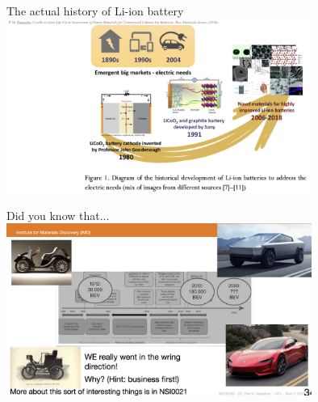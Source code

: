 \documentclass[aspectratio=169]{beamer}
\begin{document}
\begin{frame}{The actual history of Li-ion battery}
  \includegraphics[width=0.75\textwidth]{media/battery_history.png}
\end{frame}

\begin{frame}{Did you know that...}
  \includegraphics[width=0.75\textwidth]{media/old_cars.png}
\end{frame}
\end{document}
